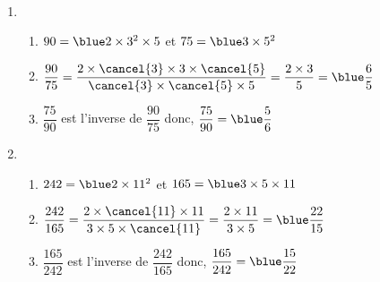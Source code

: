\ \\ [-5mm]
   \begin{enumerate}
      \item
         \begin{enumerate}
            \item $90 ={\blue 2\times3^2\times5}$ et $75 ={\blue 3\times5^2}$ \smallskip
            \item $\dfrac{90}{75} =\dfrac{2\times\cancel{3}\times3\times\cancel{5}}{\cancel{3}\times\cancel{5}\times5} =\dfrac{2\times3}{5} ={\blue \dfrac65}$ \smallskip
            \item $\dfrac{75}{90}$ est l'inverse de $\dfrac{90}{75}$ donc, $\dfrac{75}{90}={\blue \dfrac56}$ \smallskip
         \end{enumerate}
      \setcounter{enumi}{1}
      \item
         \begin{enumerate}
            \item $242 =\blue 2\times11^2$ et $165 =\blue3\times5\times11$ \smallskip
            \item $\dfrac{242}{165} =\dfrac{2\times\cancel{11}\times11}{3\times5\times\cancel{11}} =\dfrac{2\times11}{3\times5} ={\blue \dfrac{22}{15}}$ \smallskip
            \item $\dfrac{165}{242}$ est l'inverse de $\dfrac{242}{165}$ donc, $\dfrac{165}{242} ={\blue \dfrac{15}{22}}$
         \end{enumerate}
   \end{enumerate}
